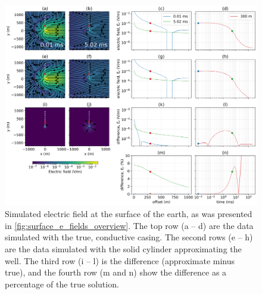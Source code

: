 \begin{figure}
    \begin{center}
    \includegraphics[width=\textwidth]{figures/em_casing/surface_e_fields_approx_casing.png}
    \end{center}
\caption{
    Simulated electric field at the surface of the earth, as was presented in \ref{fig:surface_e_fields_overview}.
    The top row (a -- d) are the data simulated with the true, conductive casing.
    The second rows (e -- h) are the data
    simulated with the solid cylinder approximating the well.
    The third row (i -- l) is the difference (approximate minus true),
    and the fourth row (m and n) show the difference as a percentage of the true solution.
}
\label{fig:surface_e_fields_approx_casing}
\end{figure}



